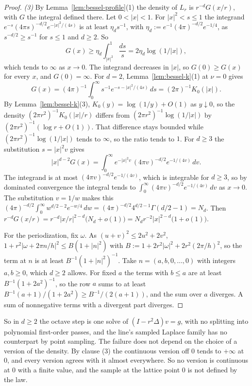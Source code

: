 \begin{proof}
\emph{(3)} By Lemma~\ref{lem:bessel-profile}(1) the density of $L_r$ is $r^{-d}G(x/r)$, with $G$
the integral defined there. Let $0 < |x| < 1$. For $|x|^2 < s \le 1$ the integrand
$e^{-s}(4\pi s)^{-d/2}e^{-|x|^2/(4s)}$ is at least $\eta_ds^{-1}$, with
$\eta_d := e^{-1}(4\pi)^{-d/2}e^{-1/4}$, as $s^{-d/2} \ge s^{-1}$ for $s \le 1$ and $d \ge 2$. So
\[
  G(x) \ge \eta_d\int_{|x|^2}^1 \frac{ds}{s} = 2\eta_d\log(1/|x|) ,
\]
which tends to $\infty$ as $x \to 0$. The integrand decreases in $|x|$, so $G(0) \ge G(x)$ for
every $x$, and $G(0) = \infty$. For $d = 2$, Lemma~\ref{lem:bessel-k}(1) at $\nu = 0$ gives
\[
  G(x) = (4\pi)^{-1}\int_0^\infty s^{-1}e^{-s-|x|^2/(4s)}\,ds = (2\pi)^{-1}K_0(|x|) .
\]
By Lemma~\ref{lem:bessel-k}(3), $K_0(y) = \log(1/y) + O(1)$ as $y \downarrow 0$, so the density
$(2\pi r^2)^{-1}K_0(|x|/r)$ differs from $(2\pi r^2)^{-1}\log(1/|x|)$ by
$(2\pi r^2)^{-1}(\log r + O(1))$. That difference stays bounded while
$(2\pi r^2)^{-1}\log(1/|x|)$ tends to $\infty$, so the ratio tends to $1$. For $d \ge 3$ the
substitution $s = |x|^2v$ gives
\[
  |x|^{d-2}G(x) = \int_0^\infty e^{-|x|^2v}\,(4\pi v)^{-d/2}e^{-1/(4v)}\,dv .
\]
The integrand is at most $(4\pi v)^{-d/2}e^{-1/(4v)}$, which is integrable for $d \ge 3$, so by
dominated convergence the integral tends to $\int_0^\infty (4\pi v)^{-d/2}e^{-1/(4v)}\,dv$ as
$x \to 0$. The substitution $v = 1/w$ makes this
$(4\pi)^{-d/2}\int_0^\infty w^{d/2-2}e^{-w/4}\,dw = (4\pi)^{-d/2}4^{d/2-1}\Gamma(d/2 - 1) = N_d$.
Then $r^{-d}G(x/r) = r^{-d}|x/r|^{2-d}\bigl(N_d + o(1)\bigr)
= N_dr^{-2}|x|^{2-d}\bigl(1 + o(1)\bigr)$.

For the periodization, fix $\omega$. As $(u + v)^2 \le 2u^2 + 2v^2$,
$1 + r^2|\omega + 2\pi n/h|^2 \le B(1 + |n|^2)$ with
$B := 1 + 2r^2|\omega|^2 + 2r^2(2\pi/h)^2$, so the term at $n$ is at least $B^{-1}(1 + |n|^2)^{-1}$.
Take $n = (a, b, 0, \dots, 0)$ with integers $a, b \ge 0$, which $d \ge 2$ allows. For fixed $a$ the terms
with $b \le a$ are at least $B^{-1}(1 + 2a^2)^{-1}$, so the row $a$ sums to at least
$B^{-1}(a + 1)/(1 + 2a^2) \ge B^{-1}/(2(a + 1))$, and the sum over $a$ diverges. A sum of
nonnegative terms with a divergent part diverges.
\end{proof}

So in $d \ge 2$ the octave step is one solve of $(I - r^2\Delta)v = g$, with no splitting into
polynomial first-order passes, and the line's sampled Laplace family has no counterpart by point
sampling. The failure does not depend on the choice of a version of the density. By clause (3) the
continuous version off $0$ tends to $+\infty$ at $0$, and every version agrees with it almost
everywhere. So no version is continuous at $0$ with a finite value, and the sample at the lattice
point $0$ is not defined by the law.

